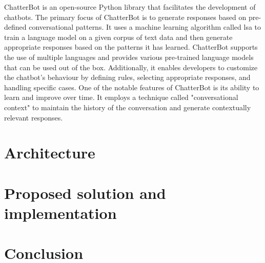 \documentclass[a4paper,fleqn]{cas-dc}
\begin{document}
ChatterBot \cite{chatterbot} is an open-source Python library that facilitates the development of chatbots. The primary focus of ChatterBot is to generate responses based on pre-defined conversational patterns. It uses a machine learning algorithm called \gls{lsa} to train a language model on a given corpus of text data and  then generate appropriate responses based on the patterns it has learned. ChatterBot supports the use of multiple languages and provides various pre-trained language models that can be used out of the box. Additionally, it enables developers to customize the chatbot's behaviour by defining rules, selecting appropriate responses, and handling specific cases. One of the notable features of ChatterBot is its ability to learn and improve over time. It employs a technique called "conversational context" to maintain the history of the conversation and generate contextually relevant responses. 

\section{Architecture}
\label{architecture}

\section{Proposed solution and implementation}
\label{proposedSolution}

\section{Conclusion}
\label{conclusion}

\printcredits

%
%



\end{document}
